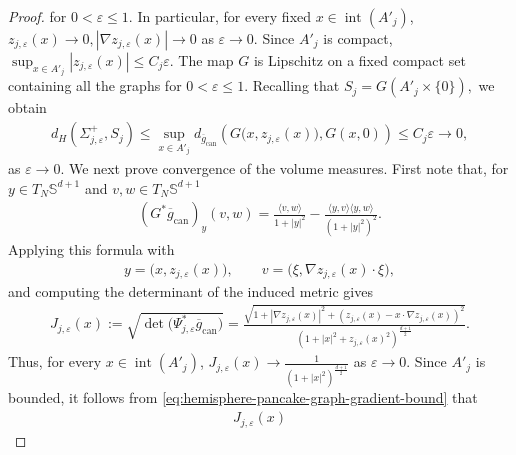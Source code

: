 \documentclass[11pt,reqno]{amsart}
\numberwithin{equation}{section}
\theoremstyle{definition}
\theoremstyle{remark}
\def\bS {\mathbb{S}}
\newcommand{\la}{\langle}
\newcommand{\ra}{\rangle}
\newcommand{\0}{\emptyset}
\newcommand{\can}{\mathrm{can}}
\begin{document}
\begin{proof}
for $0<\varepsilon\leq1$. In particular, for every fixed
$x\in\operatorname{int}(A'_j)$, $z_{j,\varepsilon}(x)
        \rightarrow
        0,
        |\nabla z_{j,\varepsilon}(x)|
        \rightarrow
        0$ as $\varepsilon\to0$. Since $A'_j$ is compact, $\sup_{x\in A'_j}|z_{j,\varepsilon}(x)| \leq C_j\varepsilon.$ The map $G$ is Lipschitz on a fixed compact set containing all the graphs
for $0<\varepsilon\leq1$. Recalling that $ S_j
        =
        G(A'_j\times\{0\}),$ we obtain
\begin{align}\label{eq:hemisphere-pancake-upper-sheet-Hausdorff}
        d_H(\Sigma_{j,\varepsilon}^+,S_j)
        \leq
        \sup_{x\in A'_j}
        d_{\overline g_{\can}}
        \left(
        G\bigl(x,z_{j,\varepsilon}(x)\bigr),
        G(x,0)
        \right)
        \leq
        C_j\varepsilon
        \rightarrow
        0,
\end{align}
as $\varepsilon\to 0.$ We next prove convergence of the volume measures. First note that, for $y\in T_N\bS^{d+1}$ and $v,w\in T_N\bS^{d+1}$
\begin{align}
        (G^*\overline g_{\can})_y(v,w)
        =
        \frac{\la v,w\ra}{1+|y|^2}
        -
        \frac{\la y,v\ra\la y,w\ra}
        {(1+|y|^2)^2}.
\end{align}
Applying this formula with
\begin{align}
        y
        =
        \bigl(x,z_{j,\varepsilon}(x)\bigr),
        \qquad
        v
        =
        \bigl(\xi,\nabla z_{j,\varepsilon}(x)\cdot\xi\bigr),
\end{align}
and computing the determinant of the induced metric gives
\begin{align}\label{eq:hemisphere-pancake-spherical-graph-Jacobian}
        J_{j,\varepsilon}(x)
        :=
        \sqrt{
        \det\bigl(\Psi_{j,\varepsilon}^*
        \overline g_{\can}\bigr)
        }
        =
        \frac{
        \sqrt{
        1+|\nabla z_{j,\varepsilon}(x)|^2
        +
        \left(
        z_{j,\varepsilon}(x)
        -
        x\cdot\nabla z_{j,\varepsilon}(x)
        \right)^2
        }
        }{
        \left(
        1+|x|^2+z_{j,\varepsilon}(x)^2
        \right)^{\frac{d+1}{2}}
        }.
\end{align}
Thus, for every $x\in\operatorname{int}(A'_j)$, $ J_{j,\varepsilon}(x) \to \frac{1}{(1+|x|^2)^{\frac{d+1}{2}}}$ as $\varepsilon \to 0.$ Since $A'_j$ is bounded, it follows from \eqref{eq:hemisphere-pancake-graph-gradient-bound} that
\begin{align}
        J_{j,\varepsilon}(x)

\end{align}
\end{proof}
\end{document}
